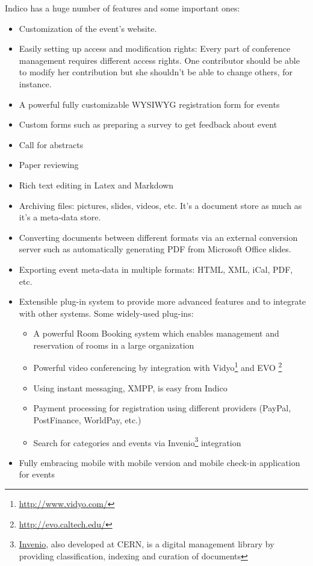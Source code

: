 \par Indico has a huge number of features and some important ones:
\begin{itemize}
  \item Customization of the event's website.
  \item Easily setting up access and modification rights: Every part of conference management requires different access rights. One contributor should be able to modify her contribution but she shouldn't be able to change others, for instance.
  \item A powerful fully customizable WYSIWYG registration form for events
  \item Custom forms such as preparing a survey to get feedback about event
  \item Call for abstracts
  \item Paper reviewing
  \item Rich text editing in Latex and Markdown
  \item Archiving files: pictures, slides, videos, etc. It's a document store as much as it's a meta-data store.
  \item Converting documents between different formats via an external conversion server such as automatically generating PDF from Microsoft Office slides.
  \item Exporting event meta-data in multiple formats: HTML, XML, iCal, PDF, etc.
  \item Extensible plug-in system to provide more advanced features and to integrate with other systems. Some widely-used plug-ins:
  \begin{itemize}
    \item A powerful Room Booking system which enables management and reservation of rooms in a large organization
    \item Powerful video conferencing by integration with Vidyo\footnote{\url{http://www.vidyo.com/}} and EVO \footnote{\url{http://evo.caltech.edu/}}
    \item Using instant messaging, XMPP, is easy from Indico
    \item Payment processing for registration using different providers (PayPal, PostFinance, WorldPay, etc.)
    \item Search for categories and events via Invenio\footnote{\href{https://invenio-software.org/}{Invenio}, also developed at \textsc{CERN}, is a digital management library by providing classification, indexing and curation of documents} integration
  \end{itemize}
  \item Fully embracing mobile with mobile version and mobile check-in application for events
\end{itemize}

